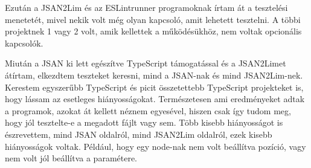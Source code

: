 Ezután a JSAN2Lim és az ESLintrunner programoknak írtam át a tesztelési menetetét, mivel nekik volt még olyan kapcsoló, amit lehetett tesztelni. A többi projektnek 1 vagy 2 volt, amik kellettek a működésükhöz, nem voltak opcionális kapcsolók.

Miután a JSAN ki lett egészítve TypeScript támogatással és a JSAN2Limet átírtam, elkezdtem teszteket keresni, mind a JSAN-nak és mind JSAN2Lim-nek.
Kerestem egyszerűbb TypeScript és picit összetettebb TypeScript projekteket is, hogy lássam az esetleges hiányosságokat.
Természetesen ami eredményeket adtak a programok, azokat át kellett néznem egyesével, hiszen csak így tudom meg, hogy jól tesztelte-e a megadott fájlt vagy sem.
Több kisebb hiányosságot is észrevettem, mind JSAN oldalról, mind JSAN2Lim oldalról, ezek kisebb hiányosságok voltak.
Például, hogy egy node-nak nem volt beállítva pozíció, vagy nem volt jól beállítva a paramétere.
